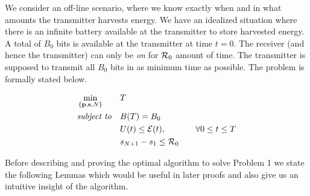 We consider an off-line scenario, where we know exactly when and in what amounts the transmitter harvests energy. We have an idealized situation where there is an infinite battery available at the transmitter to store harvested energy. A total of $B_0$ bits is available at the transmitter at time $t=0$. The receiver (and hence the transmitter) can only be \textit{on} for $\mathcal{R}_0$ amount of time. The transmitter is supposed to transmit all $B_0$ bits in as minimum time as possible. The problem is formally stated below.
\begin{problem}
\begin{align}
&\min_{\{\textbf{p},\textbf{s},N\}}			&& T
\\
&\text{\textit{subject to}} 				&& B(T)=B_0 
\label{pb1_constraint_bits}
\\
&     										&& U(t)\le \mathcal{E}(t),  		&&& \forall 0\le t\le T \label{pb1_constraint_energy}
\\
&    										&& s_{N+1}-s_1\le \mathcal{R}_0
\label{pb1_constraint_time}
\end{align}
\end{problem}
Before describing and proving the optimal algorithm to solve Problem 1 we state the following Lemmas which would be useful in later proofs and also give us an intuitive insight of the algorithm.



